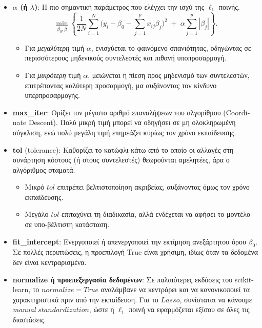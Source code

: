 \documentclass[12pt]{article}
\begin{document}
\begin{itemize}
    \item \textbf{\(\alpha\) (ή \(\lambda\))}: 
      Η πιο σημαντική παράμετρος που ελέγχει την ισχύ της \(\ell_1\) ποινής. 
      \[
        \min_{\beta_0,\beta}
        \left\{
          \frac{1}{2N}\sum_{i=1}^{N} \bigl(y_i - \beta_0 - \sum_{j=1}^{p} x_{ij}\beta_j \bigr)^2 
          \;+\;
          \alpha \sum_{j=1}^{p} |\beta_j|
        \right\}.
      \]
      \begin{itemize}
        \item Για \emph{μεγαλύτερη} τιμή \(\alpha\), ενισχύεται το φαινόμενο σπανιότητας, οδηγώντας σε περισσότερους μηδενικούς συντελεστές και πιθανή υποπροσαρμογή.
        \item Για \emph{μικρότερη} τιμή \(\alpha\), μειώνεται η πίεση προς μηδενισμό των συντελεστών, επιτρέποντας καλύτερη προσαρμογή, μα αυξάνοντας τον κίνδυνο υπερπροσαρμογής.
      \end{itemize}
    
    \item \textbf{max\_iter}: 
      Ορίζει τον μέγιστο αριθμό επαναλήψεων του αλγορίθμου (\textlatin{Coordinate Descent}). Πολύ μικρή τιμή μπορεί να οδηγήσει σε μη ολοκληρωμένη σύγκλιση, ενώ πολύ μεγάλη τιμή επηρεάζει κυρίως τον χρόνο εκπαίδευσης.
    
    \item \textbf{\textlatin{tol}} \textlatin{(tolerance)}:
      Καθορίζει το κατώφλι κάτω από το οποίο οι αλλαγές στη συνάρτηση κόστους (ή στους συντελεστές) θεωρούνται αμελητέες, άρα ο αλγόριθμος σταματά. 
      \begin{itemize}
        \item Μικρό \(tol\) επιτρέπει βελτιστοποίηση ακριβείας, αυξάνοντας όμως τον χρόνο εκπαίδευσης.
        \item Μεγάλο \(tol\) επιταχύνει τη διαδικασία, αλλά ενδέχεται να αφήσει το μοντέλο σε υπο-βέλτιστη κατάσταση.
      \end{itemize}
    
    \item \textbf{\textlatin{fit\_intercept}}:
      Ενεργοποιεί ή απενεργοποιεί την εκτίμηση ανεξάρτητου όρου \(\beta_0\). Σε πολλές περιπτώσεις, η προεπιλογή \textlatin{True} είναι χρήσιμη, ιδίως όταν τα δεδομένα δεν είναι κεντραρισμένα.
    
    \item \textbf{\textlatin{normalize} ή προεπεξεργασία δεδομένων}:
      Σε παλαιότερες εκδόσεις του \textlatin{scikit-learn}, το \(normalize=True\) αναλάμβανε να κεντράρει και να κανονικοποιεί τα χαρακτηριστικά πριν από την εκπαίδευση. Για το $Lasso$, συνίσταται να κάνουμε \textlatin{\emph{manual}} \(standardization\), ώστε η \(\ell_1\) ποινή να εφαρμόζεται εξίσου σε όλες τις διαστάσεις.
    

\end{itemize}
\end{document}
